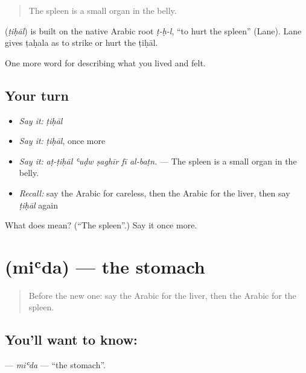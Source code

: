 \begin{quote}
The spleen is a small organ in the belly.
\end{quote}

\begin{cousinweb}
\textbf{} (\emph{ṭiḥāl}) is built on the native Arabic root \emph{ṭ-ḥ-l}, \textquotedblleft{}to hurt the spleen\textquotedblright{} (Lane). Lane gives ṭaḥala as to strike or hurt the ṭiḥāl.
\end{cousinweb}

\begin{grammarlens}[title={What you've built}]
One more word for describing what you lived and felt.
\end{grammarlens}

\subsection*{Your turn}
\begin{itemize}
\raggedright
  \item \emph{Say it:} \emph{ṭiḥāl}
  \item \emph{Say it:} \emph{ṭiḥāl}, once more
  \item \emph{Say it:} \emph{aṭ-ṭiḥāl ʿuḍw ṣaghīr fī al-baṭn.} — The spleen is a small organ in the belly.
  \item \emph{Recall:} say the Arabic for careless, then the Arabic for the liver, then say \emph{ṭiḥāl} again
\end{itemize}

\begin{tcolorbox}[breakable,colback=teal!4,colframe=teal!35!black,title={Before you move on}]
What does  mean? (\textquotedblleft{}The spleen\textquotedblright{}.) Say it once more.
\end{tcolorbox}
\section[\texorpdfstring{\ar{معدة} (miʿda)}{معدة (miʿda)}]{ (miʿda) — the stomach}

\label{lesson:AR-C504-mida}



\begin{quote}
Before the new one: say the Arabic for the liver, then the Arabic for the spleen.
\end{quote}

\subsection*{You'll want to know: }
\textbf{} — \emph{miʿda} — \textquotedblleft{}the stomach\textquotedblright{}.

